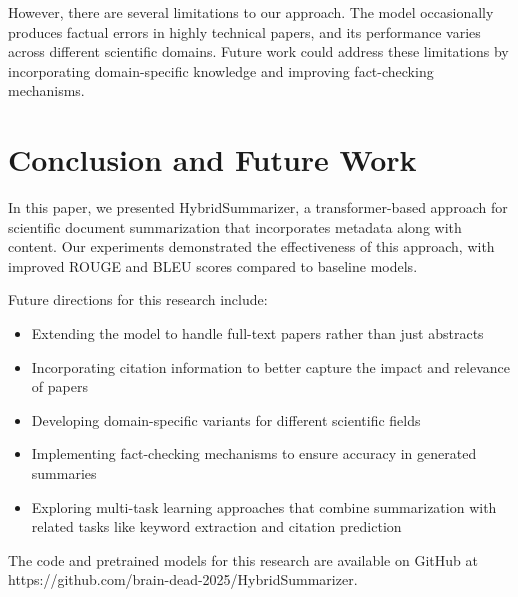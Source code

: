 \documentclass[conference]{IEEEtran}
\begin{document}
However, there are several limitations to our approach. The model occasionally produces factual errors in highly technical papers, and its performance varies across different scientific domains. Future work could address these limitations by incorporating domain-specific knowledge and improving fact-checking mechanisms.

\section{Conclusion and Future Work}
In this paper, we presented HybridSummarizer, a transformer-based approach for scientific document summarization that incorporates metadata along with content. Our experiments demonstrated the effectiveness of this approach, with improved ROUGE and BLEU scores compared to baseline models.

Future directions for this research include:

\begin{itemize}
\item Extending the model to handle full-text papers rather than just abstracts
\item Incorporating citation information to better capture the impact and relevance of papers
\item Developing domain-specific variants for different scientific fields
\item Implementing fact-checking mechanisms to ensure accuracy in generated summaries
\item Exploring multi-task learning approaches that combine summarization with related tasks like keyword extraction and citation prediction
\end{itemize}

The code and pretrained models for this research are available on GitHub at https://github.com/brain-dead-2025/HybridSummarizer.
\end{document}
